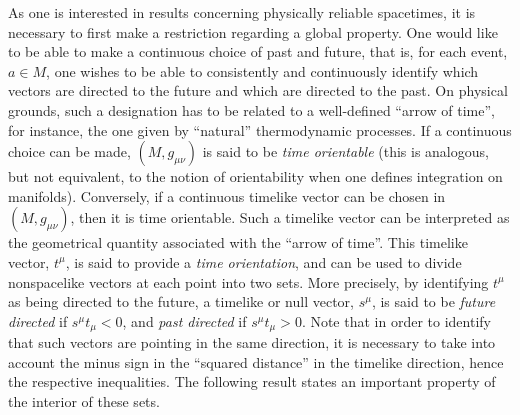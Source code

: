 \documentclass[
12pt,		%
openright,	%
twoside,  %
a4paper,			%
chapter=TITLE,		%
english,			%
french,				%
spanish,			%
brazil				%
]{USPSC-classe/USPSC}
\begin{document}
As one is interested in results concerning physically reliable spacetimes, it is necessary to first make a restriction regarding a global property. One would like to be able to make a continuous choice of past and future, that is, for each event, $a\in M$, one wishes to be able to consistently and continuously identify which vectors are directed to the future and which are directed to the past. On physical grounds, such a designation has to be related to a well-defined “arrow of time”, for instance, the one given by ``natural'' thermodynamic processes. If a continuous choice can be made, $(M,g_{\mu\nu})$ is said to be \textit{time orientable} (this is analogous, but not equivalent, to the notion of orientability when one defines integration on manifolds). Conversely, if a continuous timelike vector can be chosen in $(M,g_{\mu\nu})$, then it is time orientable. Such a timelike vector can be interpreted as the geometrical quantity associated with the “arrow of time”. This timelike vector, $t^{\mu}$, is said to provide a \textit{time orientation}, and can be used to divide nonspacelike vectors at each point into two sets. More precisely, by identifying $t^{\mu}$ as being directed to the future, a timelike or null vector, $s^{\mu}$, is said to be \textit{future directed} if $s^{\mu}t_{\mu}< 0$, and \textit{past directed} if $s^{\mu}t_{\mu}> 0$. Note that in order to identify that such vectors are pointing in the same direction, it is necessary to take into account the minus sign in the ``squared distance'' in the timelike direction, hence the respective inequalities. The following result states an important property of the interior of these sets. 
\end{document}
